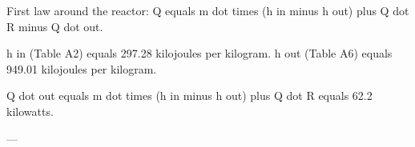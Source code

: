 First law around the reactor:  
Q equals m dot times (h in minus h out) plus Q dot R minus Q dot out.  

h in (Table A2) equals 297.28 kilojoules per kilogram.  
h out (Table A6) equals 949.01 kilojoules per kilogram.  

Q dot out equals m dot times (h in minus h out) plus Q dot R equals 62.2 kilowatts.  

---